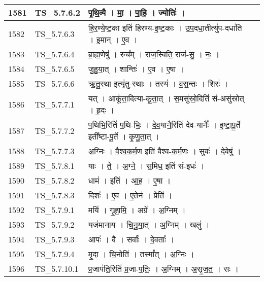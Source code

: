 \documentclass[17pt]{extarticle}
\begin{document}
\begin{longtable}{||p{0.4in}||p{0.9in}||p{4.0in}||p{0.9in}||}
        \hline
            1581 & TS\_5.7.6.2 & पृ॒थि॒व्यै   ।   मा॒   ।   पा॒हि॒   ।   ज्योतिः॑   ।    &      \\
        \hline
            1582 & TS\_5.7.6.3 & हि॒र॒ण्ये॒ष्ट॒का इति॑ हिरण्य{-}इ॒ष्ट॒काः   ।   उ॒प॒दधा॒तीत्यु॑प{-}दधा॑ति   ।   इ॒मान्   ।   ए॒व   ।    &      \\
        \hline
            1583 & TS\_5.7.6.4 & ब्रा॒ह्म॒णेषु॑   ।   रुच᳚म्   ।   राज॒स्विति॒ राज॑{-}सु॒   ।   नः॒   ।    &      \\
        \hline
            1584 & TS\_5.7.6.5 & जु॒हु॒या॒त्   ।   शान्तिः॑   ।   ए॒व   ।   ए॒षा   ।    &      \\
        \hline
            1585 & TS\_5.7.6.6 & ऋ॒तु॒स्था इत्यृ॑तु{-}स्थाः   ।   तस्य॑   ।   व॒स॒न्तः   ।   शिरः॑   ।    &      \\
        \hline
            1586 & TS\_5.7.7.1 & यत्   ।   आकू॑ता॒दित्या{-}कू॒ता॒त्   ।   स॒मसु॑स्रो॒दिति॑ सं{-}असु॑स्रोत्   ।   हृ॒दः   ।    &      \\
        \hline
            1587 & TS\_5.7.7.2 & प॒थिभि॒रिति॑ प॒थि{-}भिः॒   ।   दे॒व॒यानै॒रिति॑ देव{-}यानैः᳚   ।   इ॒ष्टा॒पू॒र्ते इती᳚ष्टा{-}पू॒र्ते   ।   कृ॒णु॒ता॒त्   ।    &      \\
        \hline
            1588 & TS\_5.7.7.3 & अ॒ग्निः   ।   वै॒श्व॒क॒र्म॒ण इति॑ वैश्व{-}क॒र्म॒णः   ।   सुवः॑   ।   दे॒वेषु॑   ।    &      \\
        \hline
            1589 & TS\_5.7.8.1 & याः   ।   ते॒   ।   अ॒ग्ने॒   ।   स॒मिध॒ इति॑ सं{-}इधः॑   ।    &      \\
        \hline
            1590 & TS\_5.7.8.2 & धाम॑   ।   इति॑   ।   आ॒ह॒   ।   ए॒षा   ।    &      \\
        \hline
            1591 & TS\_5.7.8.3 & दिशः॑   ।   ए॒व   ।   ए॒तेन॑   ।   प्रेति॑   ।    &      \\
        \hline
            1592 & TS\_5.7.9.1 & मयि॑   ।   गृ॒ह्णा॒मि॒   ।   अग्रे᳚   ।   अ॒ग्निम्   ।    &      \\
        \hline
            1593 & TS\_5.7.9.2 & यज॑मानाय   ।   चि॒नु॒या॒त्   ।   अ॒ग्निम्   ।   खलु॑   ।    &      \\
        \hline
            1594 & TS\_5.7.9.3 & आपः॑   ।   वै   ।   सर्वाः᳚   ।   दे॒वताः᳚   ।    &      \\
        \hline
            1595 & TS\_5.7.9.4 & मृ॒दा   ।   चि॒नोति॑   ।   तस्मा᳚त्   ।   अ॒ग्निः   ।    &      \\
        \hline
            1596 & TS\_5.7.10.1 & प्र॒जाप॑ति॒रिति॑ प्र॒जा{-}प॒तिः॒   ।   अ॒ग्निम्   ।   अ॒सृ॒ज॒त॒   ।   सः   ।    &      \\

\end{longtable}
\end{document}
